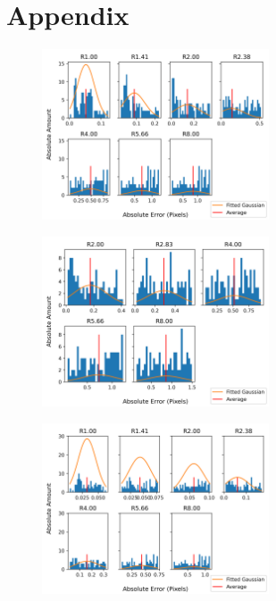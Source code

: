 \documentclass[aps,pra,a4paper,nofootinbib,onecolumn,tightenlines,longbibliography,12pt,amsfonts,amssymb,amsmath,floatfix]{revtex4-2} %
\begin{document}
\newpage
\appendix

\section{Appendix}
\label{sec:appendix}

  \begin{figure}[H]
    \begin{center}
      \includegraphics[width=0.6\textwidth]{project_pics/distro_centriod_5.png}
    \end{center}
    \caption{}
    \label{fig:box_5}
  \end{figure}

  \begin{figure}[H]
    \begin{center}
      \includegraphics[width=0.6\textwidth]{project_pics/noise_cen_scatter_5.png}
    \end{center}
    \caption{}
    \label{fig:box_5_noise}
  \end{figure}

  \begin{figure}[H]
    \begin{center}
      \includegraphics[width=0.6\textwidth]{project_pics/distro_centriod_7.png}
    \end{center}
    \caption{}
    \label{fig:box_7}
  \end{figure}
\end{document}
